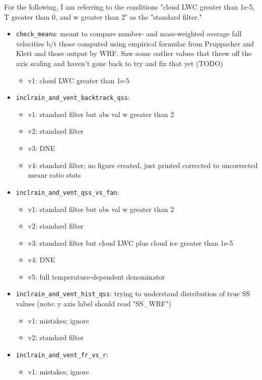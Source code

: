 \documentclass{article}
\begin{document}
\begin{itemize}
	\indent For the following, I am referring to the conditions "cloud LWC greater than 1e-5, T greater than 0, and w greater than 2" as the "standard filter."
	\begin{itemize}
		\item \texttt{check\_meanu}: meant to compare number- and mass-weighted average fall velocities b/t those computed using empirical formulae from Pruppacher and Klett and those output by WRF. Saw some outlier values that threw off the axis scaling and haven't gone back to try and fix that yet (TODO)
		\begin{itemize}
			\item v1: cloud LWC greater than 1e-5
		\end{itemize}
		\item \texttt{inclrain\_and\_vent\_backtrack\_qss}:
		\begin{itemize}
			\item v1: standard filter but abs val w greater than 2
			\item v2: standard filter
			\item v3: DNE
			\item v4: standard filter; no figure created, just printed corrected to uncorrected meanr ratio stats
		\end{itemize}
		\item \texttt{inclrain\_and\_vent\_qss\_vs\_fan}:
		\begin{itemize}
			\item v1: standard filter but abs val w greater than 2
			\item v2: standard filter
			\item v3: standard filter but cloud LWC plus cloud ice greater than 1e-5
			\item v4: DNE
			\item v5: full temperature-dependent denominator
		\end{itemize}
		\item \texttt{inclrain\_and\_vent\_hist\_qss}: trying to understand distribution of true SS values (note: y axis label should read "SS\_WRF")
		\begin{itemize}
			\item v1: mistakes; ignore
			\item v2: standard filter
		\end{itemize}
		\item \texttt{inclrain\_and\_vent\_fr\_vs\_r}:
		\begin{itemize}
			\item v1: mistakes; ignore

\end{itemize}
\end{itemize}
\end{itemize}
\end{document}
